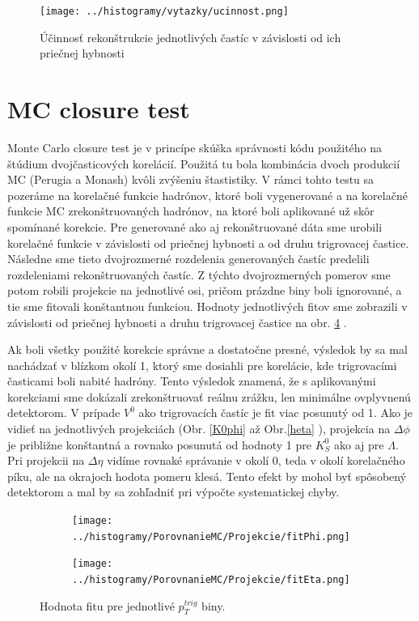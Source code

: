 \documentclass[thesismargins, thesislinespacing]{rnthesis}
\begin{document}
\begin{figure}[hbtp!]
	\centering
	\texttt{[image: ../histogramy/vytazky/ucinnost.png]}
	\caption{Účinnosť rekonštrukcie jednotlivých častíc v závislosti od ich priečnej hybnosti}
	\label{uc}
\end{figure}

\section{MC closure test}

Monte Carlo closure test je v princípe skúška správnosti kódu použitého na štúdium dvojčasticových korelácií. Použitá tu bola kombinácia dvoch produkcií MC (Perugia a Monash) kvôli zvýšeniu štastistiky. V rámci tohto testu sa pozeráme na korelačné \-funk\-cie hadrónov, ktoré boli vygenerované a na korelačné funkcie MC zrekonštruovaných hadrónov, na ktoré boli aplikované už skôr spomínané korekcie. Pre generované ako aj rekonštruované dáta sme urobili korelačné funkcie v závislosti od priečnej hybnosti  a od druhu trigrovacej častice. Následne sme tieto dvojrozmerné rozdelenia generovaných častíc predelili rozdeleniami rekonštruovaných častíc. Z týchto dvojrozmerných pomerov sme potom robili projekcie na jednotlivé osi, pričom prázdne biny boli ignorované, a tie sme fitovali konštantnou funkciou. Hodnoty jednotlivých fitov sme zobrazili v závislosti od priečnej hybnosti a druhu trigrovacej častice na obr. \ref{fitMC} . 

Ak boli všetky použité korekcie správne a dostatočne presné, výsledok by sa mal nachádzať v blízkom okolí 1, ktorý sme dosiahli pre korelácie, kde trigrovacími časticami boli nabité hadróny. Tento výsledok znamená, že s aplikovanými korekciami sme dokázali zrekonštruovať reálnu zrážku, len minimálne ovplyvnenú detektorom.
V prípade $V^0$ ako trigrovacích častíc je fit viac posunutý od 1. Ako je vidieť na jednotlivých projekciách (Obr. \ref{K0phi}  až Obr.\ref{heta}  ), projekcia na $\Delta \phi$ je približne konštantná a rovnako posunutá od hodnoty 1 pre $K^0_S$ ako aj pre $\Lambda$. Pri projekcii na $\Delta \eta$ vidíme rovnaké správanie v okolí 0, teda v okolí korelačného píku, ale na okrajoch hodota pomeru klesá. Tento efekt by mohol byť spôsobený detektorom a mal by sa zohľadniť pri výpočte systematickej chyby. 

\begin{figure}
	\centering
	\begin{subfigure}{0.5\textwidth}
		\centering
		\texttt{[image: ../histogramy/PorovnanieMC/Projekcie/fitPhi.png]}
		\caption{}
		\label{fitPhi}
	\end{subfigure}%
	\begin{subfigure}{0.5\textwidth}
		\centering
		\texttt{[image: ../histogramy/PorovnanieMC/Projekcie/fitEta.png]}
		\caption{}
		\label{fitEta}
	\end{subfigure}
	\caption{Hodnota fitu pre jednotlivé $p_{T}^{trig}$ biny.}
	\label{fitMC}
\end{figure}
\end{document}

